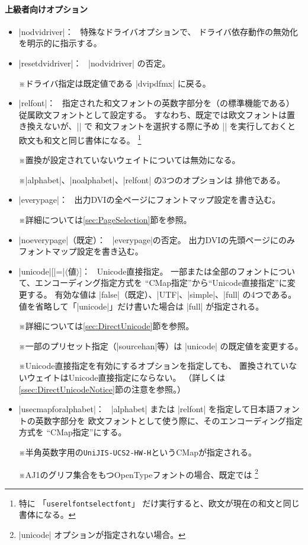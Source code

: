 \documentclass[uplatex,dvipdfmx,a4paper]{jsarticle}
\newcommand{\Meta}[1]{$\langle$\mbox{}#1\mbox{}$\rangle$}
\newcommand{\Note}{\par\noindent ※}
\newcommand{\Means}{：\ }
\providecommand{\Strong}[1]{\textsf{#1}}
\begin{document}
\paragraph{上級者向けオプション}
\begin{itemize}
\item |nodvidriver|\Means
  特殊なドライバオプションで、
  ドライバ依存動作の無効化を明示的に指示する。
\item |resetdvidriver|\Means
  |nodvidriver| の否定。
  \Note ドライバ指定は既定値である |dvipdfmx| に戻る。
\item |relfont|\Means
  指定された和文フォントの英数字部分を（{\pLaTeX}の標準機能である）
  \Strong{従属欧文フォント}として設定する。
  すなわち、既定では欧文フォントは置き換えないが、|\selectfont| で
  和文フォントを選択する際に予め |\userelfont| を実行しておくと
  欧文も和文と同じ書体になる。
  \footnote{特に
  「\texttt{userelfontselectfont}」
  だけ実行すると、欧文が現在の和文と同じ書体になる。}
  \Note 置換が設定されていないウェイトについては無効になる。
  \Note |alphabet|、|noalphabet|、|relfont| の3つのオプションは
  排他である。
\item |everypage|\Means
  出力DVIの全ページにフォントマップ設定を書き込む。
  \Note 詳細については\ref{sec:PageSelection}節を参照。
\item |noeverypage|（既定）\Means
  |everypage|の否定。
  出力DVIの先頭ページにのみフォントマップ設定を書き込む。
\item |unicode|[|=|\Meta{値}]\Means
  Unicode直接指定。
  一部または全部のフォントについて、エンコーディング指定方式を
  “CMap指定”から“Unicode直接指定”に変更する。
  有効な値は |false|（既定）、|UTF|、|simple|、|full| の4つである。
  値を省略して「|unicode|」だけ書いた場合は |full| が指定される。
  \Note 詳細については\ref{sec:DirectUnicode}節を参照。
  \Note 一部のプリセット指定（|sourcehan|等）は
  |unicode| の既定値を変更する。
  \Note Unicode直接指定を有効にするオプションを指定しても、
    置換されて\Strong{いない}ウェイトはUnicode直接指定にならない。
    （詳しくは\ref{ssec:DirectUnicodeNotice}節の注意を参照。）
\item |usecmapforalphabet|\Means
  |alphabet| または |relfont| を指定して日本語フォントの英数字部分を
  欧文フォントとして使う際に、そのエンコーディング指定方式を
  “CMap指定”にする。
  \Note 半角英数字用の\texttt{UniJIS-UCS2-HW-H}というCMapが指定される。
  \Note AJ1のグリフ集合をもつOpenTypeフォントの場合、既定では
  \footnote{|unicode| オプションが指定されない場合。}%

\end{itemize}
\end{document}

